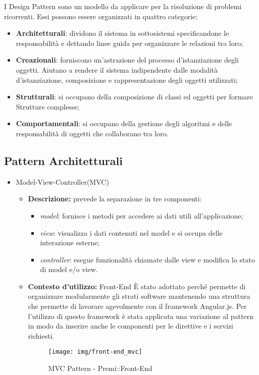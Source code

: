 I \gls{Design Pattern} sono un modello da applicare per la risoluzione di problemi ricorrenti. Essi possono essere organizzati in quattro categorie:
\begin{itemize}
	\item \textbf{Architetturali}: dividono il sistema in sottosistemi specificandone le responsabilità e dettando linee guida per organizzare le relazioni tra loro;
	\item \textbf{Creazionali}: forniscono un'astrazione del processo d'istanziazione degli oggetti. Aiutano a rendere il sistema indipendente dalle modalità d'istanziazione, composizione e rappresentazione degli oggetti utilizzati;
	\item \textbf{Strutturali}: si occupano della composizione di classi ed oggetti per formare Strutture complesse;
	\item \textbf{Comportamentali}: si occupano della gestione degli algoritmi e delle responsabilità di oggetti che collaborano tra loro.
\end{itemize}

\subsection{Pattern Architetturali}
\begin{itemize}
	\item Model-View-Controller(\gls{MVC})
	\begin{itemize}
		\item \textbf{Descrizione:} prevede la separazione in tre componenti:
		\begin{itemize}
			\item \textit{model}: fornisce i metodi per accedere ai dati utili all'applicazione;
			\item \textit{view}:  visualizza i dati contenuti nel model e si occupa delle interazione esterne;
			\item \textit{controller}: esegue funzionalità chiamate dalle view e modifica lo stato di model e/o view.
		\end{itemize}
		\item \textbf{Contesto d'utilizzo:} \gls{Front-End} \newline È stato adottato perché permette di organizzare modularmente gli strati software mantenendo una struttura che permette di lavorare agevolmente con il \gls{framework} \gls{Angular}.js. Per l'utilizzo di questo framework è stata applicata una variazione al pattern in modo da inserire anche le componenti per le direttive e i servizi richiesti.
		\begin{figure}[h]
			\centering
			\texttt{[image: img/front-end\_mvc]}
			\caption[MVC Pattern - Premi::Front-End]{MVC Pattern - Premi::Front-End}
		\end{figure}
	\end{itemize}
\end{itemize}

